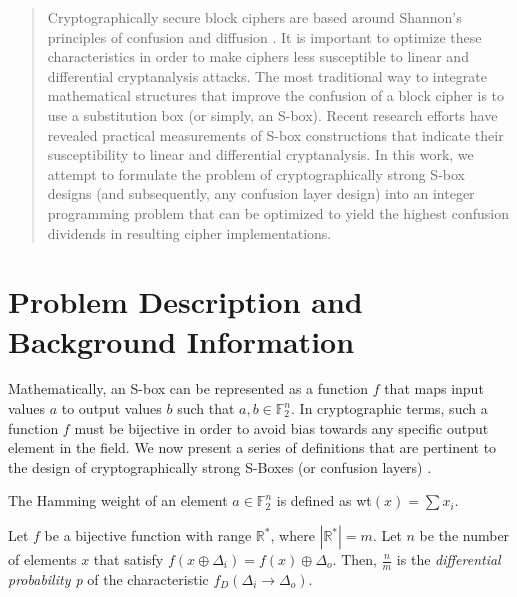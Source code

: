 \documentclass[11pt]{article}
\newcommand{\field}[1]{\mathbb{#1}} %
\begin{document}

\begin{abstract}
Cryptographically secure block ciphers are based around Shannon's principles of confusion and diffusion \cite{Kim90astudy}. It is important to optimize these characteristics in order to make ciphers less susceptible to linear and differential cryptanalysis attacks. The most traditional way to integrate mathematical structures that improve the confusion of a block cipher is to use a substitution box  (or simply, an S-box). Recent research efforts have revealed practical measurements of S-box constructions that indicate their susceptibility to linear and differential cryptanalysis. In this work, we attempt to formulate the problem of cryptographically strong S-box designs (and subsequently, any confusion layer design) into an integer programming problem that can be optimized to yield the highest confusion dividends in resulting cipher implementations.
\end{abstract}

\section{Problem Description and Background Information}

Mathematically, an S-box can be represented as a function $f$ that maps input values $a$ to output values $b$ such that $a,b \in \field{F}_2^n$. In cryptographic terms, such a function $f$ must be bijective in order to avoid bias towards any specific output element in the field. We now present a series of definitions that are pertinent to the design of cryptographically strong S-Boxes (or confusion layers) \cite{Mar_newanalysis}.


\begin{define}
The Hamming weight of an element $a \in \field{F}_2^n$ is defined as wt$(x) = \sum x_i$.
\end{define}

\begin{define}
Let $f$ be a bijective function with range $\mathbb{R^*}$, where $|\mathbb{R^*}| = m$. Let $n$ be the number of elements $x$ that satisfy $f(x \oplus \Delta_i) = f(x) \oplus \Delta_o$. Then, $\frac{n}{m}$ is the \emph{differential probability p} of the characteristic $f_D(\Delta_i \to \Delta_o)$.
\end{define}
\end{document}
